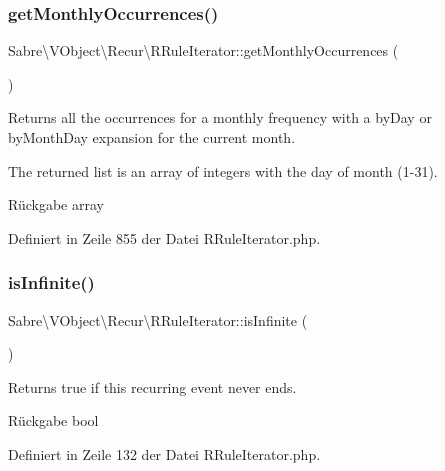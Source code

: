 \subsubsection{\texorpdfstring{get\+Monthly\+Occurrences()}{getMonthlyOccurrences()}}
{\footnotesize\ttfamily Sabre\textbackslash{}\+V\+Object\textbackslash{}\+Recur\textbackslash{}\+R\+Rule\+Iterator\+::get\+Monthly\+Occurrences (\begin{DoxyParamCaption}{ }\end{DoxyParamCaption})\hspace{0.3cm}{\ttfamily [protected]}}

Returns all the occurrences for a monthly frequency with a \textquotesingle{}by\+Day\textquotesingle{} or \textquotesingle{}by\+Month\+Day\textquotesingle{} expansion for the current month.

The returned list is an array of integers with the day of month (1-\/31).

\begin{DoxyReturn}{Rückgabe}
array 
\end{DoxyReturn}


Definiert in Zeile 855 der Datei R\+Rule\+Iterator.\+php.

\mbox{\label{class_sabre_1_1_v_object_1_1_recur_1_1_r_rule_iterator_a54c820d38ed626726f4102fd20aba775}} 
\subsubsection{\texorpdfstring{is\+Infinite()}{isInfinite()}}
{\footnotesize\ttfamily Sabre\textbackslash{}\+V\+Object\textbackslash{}\+Recur\textbackslash{}\+R\+Rule\+Iterator\+::is\+Infinite (\begin{DoxyParamCaption}{ }\end{DoxyParamCaption})}

Returns true if this recurring event never ends.

\begin{DoxyReturn}{Rückgabe}
bool 
\end{DoxyReturn}


Definiert in Zeile 132 der Datei R\+Rule\+Iterator.\+php.

